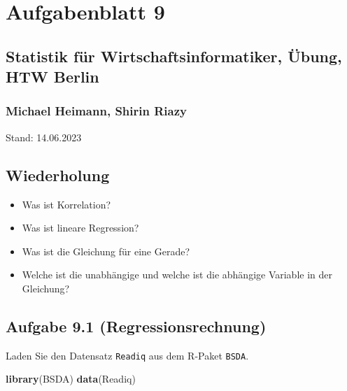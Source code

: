 \documentclass[
]{article}
\author{}
\date{\vspace{-2.5em}}
\newenvironment{Shaded}{\begin{snugshade}}{\end{snugshade}}
\newcommand{\FunctionTok}[1]{\textcolor[rgb]{0.13,0.29,0.53}{\textbf{#1}}}
\newcommand{\NormalTok}[1]{#1}
\providecommand{\tightlist}{%
  \setlength{\itemsep}{0pt}\setlength{\parskip}{0pt}}
\begin{document}
\hypertarget{aufgabenblatt-9}{%
\section{Aufgabenblatt 9}\label{aufgabenblatt-9}}

\hypertarget{statistik-fuxfcr-wirtschaftsinformatiker-uxfcbung-htw-berlin}{%
\subsection{Statistik für Wirtschaftsinformatiker, Übung, HTW
Berlin}\label{statistik-fuxfcr-wirtschaftsinformatiker-uxfcbung-htw-berlin}}

\hypertarget{michael-heimann-shirin-riazy}{%
\subsubsection{Michael Heimann, Shirin
Riazy}\label{michael-heimann-shirin-riazy}}

Stand: 14.06.2023

\hypertarget{wiederholung}{%
\subsection{Wiederholung}\label{wiederholung}}

\begin{itemize}
\tightlist
\item
  Was ist Korrelation?
\item
  Was ist lineare Regression?
\item
  Was ist die Gleichung für eine Gerade?
\item
  Welche ist die unabhängige und welche ist die abhängige Variable in
  der Gleichung?
\end{itemize}

\hypertarget{aufgabe-9.1-regressionsrechnung}{%
\subsection{Aufgabe 9.1
(Regressionsrechnung)}\label{aufgabe-9.1-regressionsrechnung}}

Laden Sie den Datensatz \texttt{Readiq} aus dem R-Paket \texttt{BSDA}.

\begin{Shaded}
\begin{Highlighting}[]
\FunctionTok{library}\NormalTok{(BSDA)}
\FunctionTok{data}\NormalTok{(Readiq)}
\end{Highlighting}
\end{Shaded}
\end{document}
